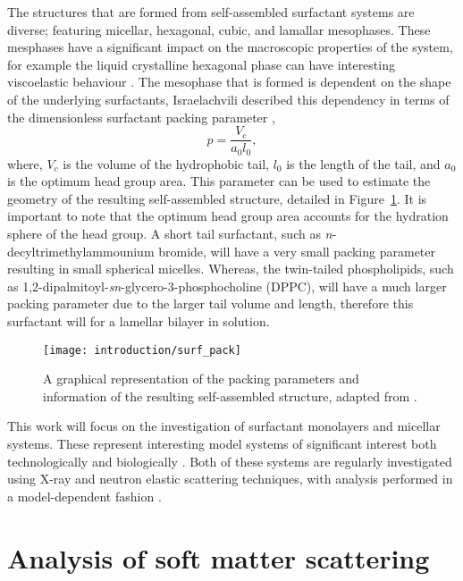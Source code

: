 The structures that are formed from self-assembled surfactant systems are diverse; featuring micellar, hexagonal, cubic, and lamallar mesophases.
These mesphases have a significant impact on the macroscopic properties of the system, for example the liquid crystalline hexagonal phase can have interesting viscoelastic behaviour \cite{jurasin_lamellar_2013,cordobes_linear_1997}.
The mesophase that is formed is dependent on the shape of the underlying surfactants, Israelachvili described this dependency in terms of the dimensionless surfactant packing parameter \cite{israelachvili_intermolecular_2011},
%
\begin{equation}
p = \frac{V_c}{a_0l_0},
\end{equation}
%
where, $V_c$ is the volume of the hydrophobic tail, $l_0$ is the length of the tail, and $a_0$ is the optimum head group area.
This parameter can be used to estimate the geometry of the resulting self-assembled structure, detailed in Figure~\ref{fig:pack}.
It is important to note that the optimum head group area accounts for the hydration sphere of the head group.
A short tail surfactant, such as \emph{n}-decyltrimethylammounium bromide, will have a very small packing parameter resulting in small spherical micelles.
Whereas, the twin-tailed phospholipids, such as 1,2-dipalmitoyl-\emph{sn}-glycero-3-phosphocholine (DPPC), will have a much larger packing parameter due to the larger tail volume and length, therefore this surfactant will for a lamellar bilayer in solution.
%
\begin{figure}
    \centering
    \texttt{[image: introduction/surf\_pack]}
    \caption{A graphical representation of the packing parameters and information of the resulting self-assembled structure, adapted from \cite{israelachvili_intermolecular_2011}.}
    \label{fig:pack}
\end{figure}
%

This work will focus on the investigation of surfactant monolayers and micellar systems.
These represent interesting model systems of significant interest both technologically \cite{anton_reverse_2010,zagnoni_miniaturised_2012} and biologically \cite{kataoka_block_2012,mohwald_phospholipid_1990,kewalramani_effects_2010}.
Both of these systems are regularly investigated using X-ray and neutron elastic scattering techniques, with analysis performed in a model-dependent fashion \cite{pambou_structural_2015,hayward_liquid_2015,rodriguez-loureiro_neutron_2017,hazell_langmuir_2016}.

\section{Analysis of soft matter scattering}

